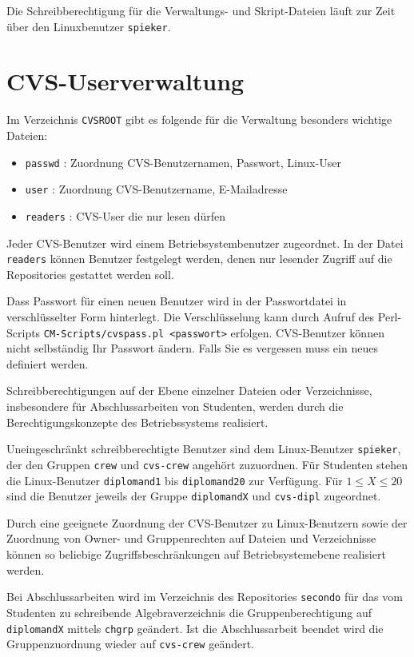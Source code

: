 \documentclass[a4paper, 10pt]{article}
\newcommand{\file}[1]{\texttt{#1}}
\begin{document}
Die Schreibberechtigung f\"ur die Verwaltungs- und Skript-Dateien l\"auft  zur
Zeit \"uber den Linuxbenutzer \file{spieker}.

\section{CVS-Userverwaltung}
Im Verzeichnis \file{CVSROOT} gibt es folgende f\"ur die Verwaltung besonders wichtige Dateien:
\begin{itemize}
  \item \file{passwd} : Zuordnung CVS-Benutzernamen, Passwort, Linux-User
  \item \file{user} : Zuordnung CVS-Benutzername, E-Mailadresse
  \item \file{readers} : CVS-User die nur lesen d\"urfen
\end{itemize}
Jeder CVS-Benutzer wird einem Betriebsystembenutzer zugeordnet. In der Datei
\file{readers} k\"onnen Benutzer festgelegt werden, denen nur lesender Zugriff
auf die Repositories gestattet werden soll.

Dass Passwort f\"ur einen neuen Benutzer wird in der Passwortdatei in
verschl\"usselter Form hinterlegt. Die Verschl\"usselung kann durch Aufruf
des Perl-Scripts \file{CM-Scripts/cvspass.pl <passwort>} erfolgen. CVS-Benutzer
k\"onnen nicht selbst\"andig Ihr Passwort \"andern. Falls Sie es vergessen
muss ein neues definiert werden.

Schreibberechtigungen auf der Ebene einzelner Dateien oder Verzeichnisse,
insbesondere f\"ur Abschlussarbeiten von Studenten, werden durch die
Berechtigungskonzepte des Betriebssystems realisiert.

Uneingeschr\"ankt schreibberechtigte Benutzer sind dem Linux-Benutzer \file{spieker},
der den Gruppen \file{crew} und \file{cvs-crew} angeh\"ort zuzuordnen. F\"ur
Studenten stehen die Linux-Benutzer \file{diplomand1} bis \file{diplomand20}
zur Verf\"ugung. F\"ur $1 \leq X \leq 20$ sind die Benutzer jeweils der Gruppe
\file{diplomandX} und \file{cvs-dipl} zugeordnet.

Durch eine geeignete Zuordnung der CVS-Benutzer zu Linux-Benutzern sowie der
Zuordnung von Owner- und Gruppenrechten auf Dateien und Verzeichnisse k\"onnen
so beliebige Zugriffsbeschr\"ankungen auf Betriebsystemebene realisiert
werden.

Bei Abschlussarbeiten wird im Verzeichnis des Repositories \file{secondo} f\"ur
das vom Studenten zu schreibende Algebraverzeichnis die Gruppenberechtigung auf
\file{diplomandX} mittels \file{chgrp} ge\"andert. Ist die Abschlussarbeit beendet
wird die Gruppenzuordnung wieder auf \file{cvs-crew} ge\"andert.
\end{document}
